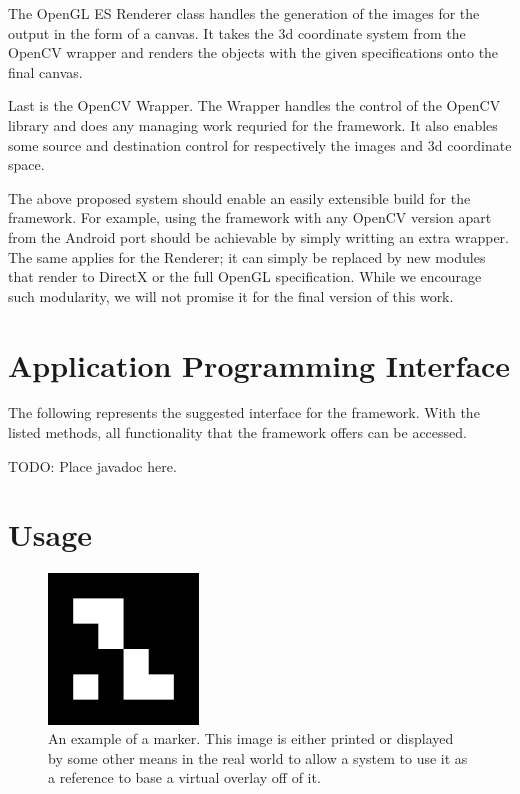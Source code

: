 The OpenGL ES Renderer class handles the generation of the images for the output in the form of a canvas.
It takes the 3d coordinate system from the OpenCV wrapper and renders the objects with the given specifications onto the final canvas.

Last is the OpenCV Wrapper. The Wrapper handles the control of the OpenCV library and does any managing work requried for the framework.
It also enables some source and destination control for respectively the images and 3d coordinate space.

The above proposed system should enable an easily extensible build for the framework.
For example, using the framework with any OpenCV version apart from the Android port should be achievable by simply writting an extra wrapper.
The same applies for the Renderer; it can simply be replaced by new modules that render to DirectX or the full OpenGL specification.
While we encourage such modularity, we will not promise it for the final version of this work.

\section{Application Programming Interface}

The following represents the suggested interface for the framework.
With the listed methods, all functionality that the framework offers can be accessed.

TODO: Place javadoc here.

\section{Usage}

\begin{figure}
	\centering
	\includegraphics[width=4cm]{img/marker_example.png}
	\caption[Example Marker.]{An example of a marker. This image is either printed or displayed by some other means in the real world to allow a system to use it as a reference to base a virtual overlay off of it.}
	\label{fig:marker_example}
\end{figure}

